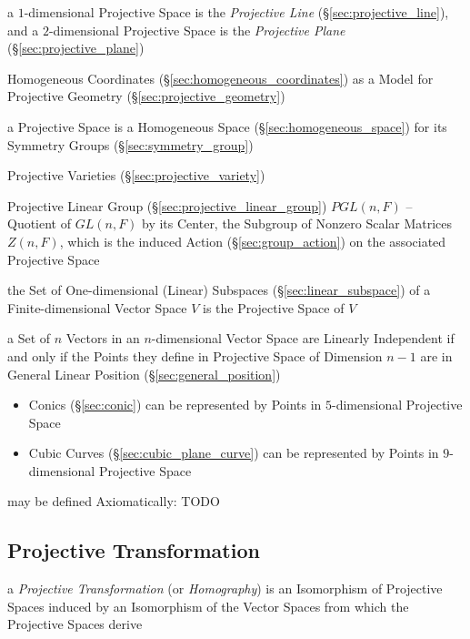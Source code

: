 a $1$-dimensional Projective Space is the \emph{Projective Line}
(\S\ref{sec:projective_line}), and a $2$-dimensional Projective Space is the
\emph{Projective Plane} (\S\ref{sec:projective_plane})

Homogeneous Coordinates (\S\ref{sec:homogeneous_coordinates}) as a Model for
Projective Geometry (\S\ref{sec:projective_geometry})

a Projective Space is a Homogeneous Space (\S\ref{sec:homogeneous_space}) for
its Symmetry Groups (\S\ref{sec:symmetry_group}) %

\fist Projective Varieties (\S\ref{sec:projective_variety})

Projective Linear Group (\S\ref{sec:projective_linear_group}) $PGL(n,F)$ --
Quotient of $GL(n,F)$ by its Center, the Subgroup of Nonzero Scalar Matrices
$Z(n,F)$, which is the induced Action (\S\ref{sec:group_action}) on the
associated Projective Space

the Set of One-dimensional (Linear) Subspaces (\S\ref{sec:linear_subspace}) of a
Finite-dimensional Vector Space $V$ is the Projective Space of $V$

a Set of $n$ Vectors in an $n$-dimensional Vector Space are Linearly
Independent if and only if the Points they define in Projective Space of
Dimension $n-1$ are in General Linear Position (\S\ref{sec:general_position})

\begin{itemize}
  \item Conics (\S\ref{sec:conic}) can be represented by Points in
    $5$-dimensional Projective Space
  \item Cubic Curves (\S\ref{sec:cubic_plane_curve}) can be represented by
    Points in $9$-dimensional Projective Space
\end{itemize}

may be defined Axiomatically: TODO



\subsection{Projective Transformation}\label{sec:projective_transformation}

a \emph{Projective Transformation} (or \emph{Homography}) is an Isomorphism of
Projective Spaces induced by an Isomorphism of the Vector Spaces from which the
Projective Spaces derive

